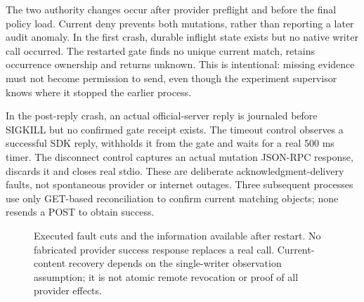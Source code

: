 \documentclass[11pt,letterpaper]{article}
\begin{document}
The two authority changes occur after provider preflight and before the final
policy load. Current deny prevents both mutations, rather than reporting a
later audit anomaly. In the first crash, durable inflight state exists but no
native writer call occurred. The restarted gate finds no unique current match,
retains occurrence ownership and returns unknown. This is intentional: missing
evidence must not become permission to send, even though the experiment
supervisor knows where it stopped the earlier process.

In the post-reply crash, an actual official-server reply is journaled before
SIGKILL but no confirmed gate receipt exists. The timeout control observes a
successful SDK reply, withholds it from the gate and waits for a real 500 ms
timer. The disconnect control captures an actual mutation JSON-RPC response,
discards it and closes real stdio. These are deliberate acknowledgment-delivery
faults, not spontaneous provider or internet outages. Three subsequent
processes use only GET-based reconciliation to confirm current matching objects;
none resends a POST to obtain success.

\begin{figure}[tbp]
\centering
{}
\caption{Executed fault cuts and the information available after restart.
No fabricated provider success response replaces a real call. Current-content
recovery depends on the single-writer observation assumption; it is not atomic
remote revocation or proof of all provider effects.}
\label{fig:owned-recovery}
\end{figure}
\end{document}

